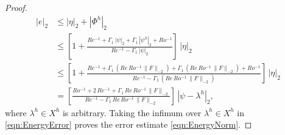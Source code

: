 \begin{proof}
  \begin{align}
    |e|_2
    &\le |\eta|_2
    + |\Phi^h|_2 \nonumber \\[0.2cm]
    &\le \left[
    1
    + \frac{Re^{-1}
      + \Gamma_1 \, |\psi|_2
      + \Gamma_1 \, |\psi^h|_2
      + Ro^{-1}} {Re^{-1}
      - \Gamma_1 \, |\psi|_2}
      \right] \, |\eta|_2 \nonumber \\[0.2cm]
    &\le \left[
    1
    + \frac{Re^{-1}
      + \Gamma_1 \, \left( Re \, Ro^{-1} \, \| F \|_{-2} \right)
      + \Gamma_1 \, \left( Re \, Ro^{-1} \, \| F \|_{-2} \right)
      + Ro^{-1}} {Re^{-1}
      - \Gamma_1 \, \left( Re \, Ro^{-1} \, \| F \|_{-2} \right) }
      \right] \, |\eta|_2 \nonumber \\
  &=
  \left[
  \frac{
  Ro^{-1}
  + 2 \, Re^{-1}
  + \Gamma_1 \, Re \, Ro^{-1} \, \| F \|_{-2}
  }
  {
  Re^{-1}
  - \Gamma_1 \, Re \, Ro^{-1} \, \| F \|_{-2}
  }
  \right] \, | \psi-\lambda^h |_2 ,
    \label{eqn:EnergyError}
  \end{align}
where $\lambda^h \in X^h$ is arbitrary.
Taking the infimum over $\lambda^h \in X^h$ in \eqref{eqn:EnergyError} proves the error estimate \eqref{eqn:EnergyNorm}.
\hfill
\end{proof}

